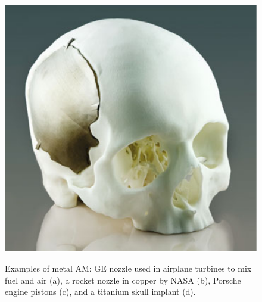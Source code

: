 \begin{figure}
{        \includegraphics[scale=0.20]{Images/skull.png}
    }
    
    \caption[Examples of metals AM.]{Examples of metal AM: GE nozzle used in airplane turbines to mix fuel and air (a), a rocket nozzle in copper by NASA (b), Porsche engine pistons (c), and a titanium skull implant (d).}
    \label{fig:amexamples}
\end{figure}

